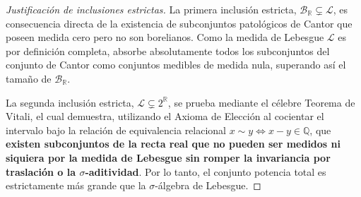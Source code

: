 \begin{proof}[Justificación de inclusiones estrictas]
	La primera inclusión estricta, $\mathcal{B}_\mathbb{R} \subsetneq \mathcal{L}$, es consecuencia directa de la existencia de subconjuntos patológicos de Cantor que poseen medida cero pero no son borelianos. Como la medida de Lebesgue $\mathcal{L}$ es por definición completa, absorbe absolutamente todos los subconjuntos del conjunto de Cantor como conjuntos medibles de medida nula, superando así el tamaño de $\mathcal{B}_\mathbb{R}$.
	
	La segunda inclusión estricta, $\mathcal{L} \subsetneq 2^\mathbb{R}$, se prueba mediante el célebre Teorema de Vitali, el cual demuestra, utilizando el Axioma de Elección al cocientar el intervalo bajo la relación de equivalencia relacional $x \sim y \iff x - y \in \mathbb{Q}$, que \textbf{existen subconjuntos de la recta real que no pueden ser medidos ni siquiera por la medida de Lebesgue sin romper la invariancia por traslación o la $\sigma$-aditividad}. Por lo tanto, el conjunto potencia total es estrictamente más grande que la $\sigma$-álgebra de Lebesgue.
\end{proof}

